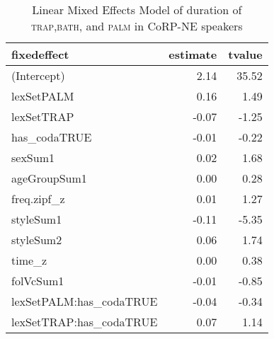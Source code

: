 \begin{table}[ht]
\centering
\begin{tabular}{lrr}
  \hline
fixedeffect & estimate & tvalue \\ 
  \hline
(Intercept) & 2.14 & 35.52 \\ 
  lexSetPALM & 0.16 & 1.49 \\ 
  lexSetTRAP & -0.07 & -1.25 \\ 
  has\_codaTRUE & -0.01 & -0.22 \\ 
  sexSum1 & 0.02 & 1.68 \\ 
  ageGroupSum1 & 0.00 & 0.28 \\ 
  freq.zipf\_z & 0.01 & 1.27 \\ 
  styleSum1 & -0.11 & -5.35 \\ 
  styleSum2 & 0.06 & 1.74 \\ 
  time\_z & 0.00 & 0.38 \\ 
  folVcSum1 & -0.01 & -0.85 \\ 
  lexSetPALM:has\_codaTRUE & -0.04 & -0.34 \\ 
  lexSetTRAP:has\_codaTRUE & 0.07 & 1.14 \\ 
   \hline
\end{tabular}
\caption{Linear Mixed Effects Model of duration of \textsc{trap},\textsc{bath}, and \textsc{palm} in CoRP-NE speakers \label{tbl:TBPdurNE}} 
\end{table}
